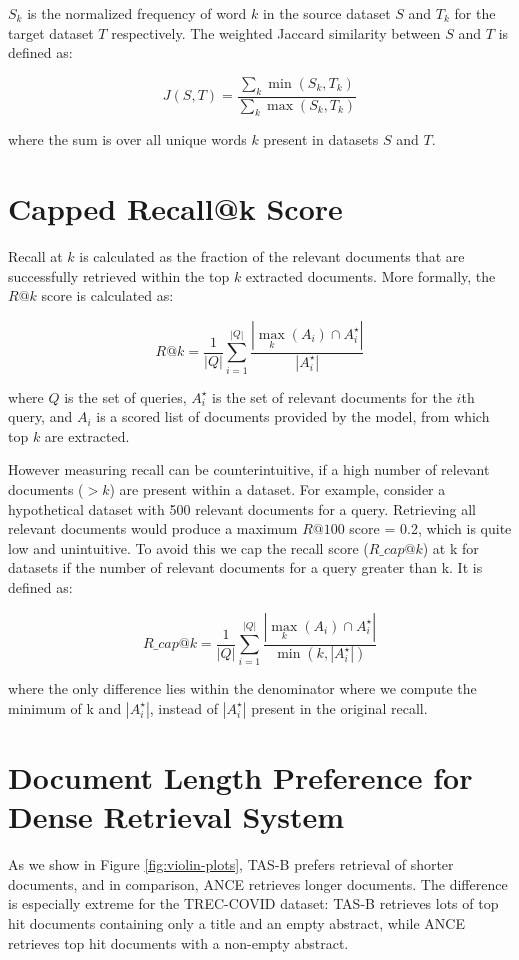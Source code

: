\documentclass{article}
\begin{document}
${S_k}$ is the normalized frequency of word $k$ in the source dataset $S$ and ${T_k}$ for the target dataset $T$ respectively. The weighted Jaccard similarity between $S$ and $T$ is defined as:

\[ J(S, T) = \frac{\sum_{k}\min(S_k, T_k)}{\sum_{k}\max(S_k, T_k)}\] 

where the sum is over all unique words $k$ present in datasets $S$ and $T$.


\section{Capped Recall@k Score}\label{sec:capped_recall_score}
\vspace{-2mm}

Recall at $k$ is calculated as the fraction of the relevant documents that are successfully retrieved within the top $k$ extracted documents. More formally, the $R@k$ score is calculated as:

\[ R@k = \frac{1}{|Q|} \sum_{i=1}^{|Q|}\frac{|\max_k(A_i) \cap A_i^\star|}{|A_i^\star|} \]

where $Q$ is the set of queries, $A_i^\star$ is the set of relevant documents for the $i$th query, and $A_i$ is a scored list of documents provided by the model, from which top $k$ are extracted. 

However measuring recall can be counterintuitive, if a high number of relevant documents ($>k$) are present within a dataset. For example, consider a hypothetical dataset with 500 relevant documents for a query. Retrieving all relevant documents would produce a maximum $R@100$ score = 0.2, which is quite low and unintuitive. To avoid this we cap the recall score ($R\_cap@k$) at k for datasets if the number of relevant documents for a query greater than k. It is defined as: 

\[ R\_cap@k = \frac{1}{|Q|} \sum_{i=1}^{|Q|}\frac{|\max_k(A_i) \cap A_i^\star|}{\min(k,|A_i^\star|)} \] 

where the only difference lies within the denominator where we compute the minimum of k and $|A_i^\star|$, instead of $|A_i^\star|$ present in the original recall.

\section{Document Length Preference for Dense Retrieval System} \label{sec:dense_retrieval_length_preference} 

As we show in Figure \ref{fig:violin-plots}, TAS-B prefers retrieval of shorter documents, and in comparison, ANCE retrieves longer documents. The difference is especially extreme for the TREC-COVID dataset: TAS-B retrieves lots of top hit documents containing only a title and an empty abstract, while ANCE retrieves top hit documents with a non-empty abstract.
\end{document}
